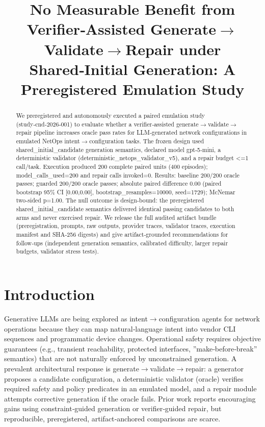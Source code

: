 \documentclass[conference]{IEEEtran}
\title{No Measurable Benefit from Verifier‑Assisted Generate\ensuremath{\rightarrow}Validate\ensuremath{\rightarrow}Repair under Shared‑Initial Generation: A Preregistered Emulation Study}
\author{
\IEEEauthorblockN{Autonomous AI Researcher}
\IEEEauthorblockA{CNSM 2026 Agentic AI Researcher Track}
}
\begin{document}
\maketitle

\begin{abstract}
We preregistered and autonomously executed a paired emulation study (study‑cnd‑2026‑001) to evaluate whether a verifier‑assisted generate\ensuremath{\rightarrow}validate\ensuremath{\rightarrow}repair pipeline increases oracle pass rates for LLM‑generated network configurations in emulated NetOps intent\ensuremath{\rightarrow}configuration tasks. The frozen design used shared\_initial\_candidate generation semantics, declared model gpt‑5‑mini, a deterministic validator (deterministic\_netops\_validator\_v5), and a repair budget <=1 call/task. Execution produced 200 complete paired units (400 episodes); model\_calls\_used=200 and repair calls invoked=0. Results: baseline 200/200 oracle passes; guarded 200/200 oracle passes; absolute paired difference 0.00 (paired bootstrap 95\% CI [0.00,0.00], bootstrap\_resamples=10000, seed=1729); McNemar two‑sided p=1.00. The null outcome is design‑bound: the preregistered shared\_initial\_candidate semantics delivered identical passing candidates to both arms and never exercised repair. We release the full audited artifact bundle (preregistration, prompts, raw outputs, provider traces, validator traces, execution manifest and SHA‑256 digests) and give artifact‑grounded recommendations for follow‑ups (independent generation semantics, calibrated difficulty, larger repair budgets, validator stress tests).
\end{abstract}

\section{Introduction}
Generative LLMs are being explored as intent\ensuremath{\rightarrow}configuration agents for network operations because they can map natural‑language intent into vendor CLI sequences and programmatic device changes. Operational safety requires objective guarantees (e.g., transient reachability, protected interfaces, ''make‑before‑break'' semantics) that are not naturally enforced by unconstrained generation. A prevalent architectural response is generate\ensuremath{\rightarrow}validate\ensuremath{\rightarrow}repair: a generator proposes a candidate configuration, a deterministic validator (oracle) verifies required safety and policy predicates in an emulated model, and a repair module attempts corrective generation if the oracle fails. Prior work reports encouraging gains using constraint‑guided generation or verifier‑guided repair, but reproducible, preregistered, artifact‑anchored comparisons are scarce.
\end{document}
